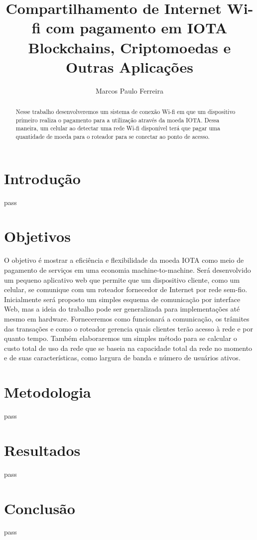 \documentclass{article}
\begin{document}
\title{%
  Compartilhamento de Internet Wi-fi com pagamento em IOTA \\
  \large Blockchains, Criptomoedas e Outras Aplicações}
    
\author{Marcos Paulo Ferreira}

\maketitle

\begin{abstract}
Nesse trabalho desenvolveremos um sistema de conexão Wi-fi em que um dispositivo primeiro realiza
o pagamento para a utilização através da moeda IOTA. Dessa maneira, um celular ao detectar uma rede
Wi-fi disponível terá que pagar uma quantidade de moeda para o roteador para se conectar ao ponto de acesso.
\end{abstract}


\section{Introdução}\label{sec:Introduction}

pass


\section{Objetivos}\label{sec:Goals}

O objetivo é mostrar a eficiência e flexibilidade da moeda IOTA como meio de pagamento de serviços em uma economia
machine-to-machine. Será desenvolvido um pequeno aplicativo web que permite que um dispositivo cliente, como um
celular, se comunique com um roteador fornecedor de Internet por rede sem-fio. Inicialmente será proposto
um simples esquema de comunicação por interface Web, mas a ideia do trabalho pode ser generalizada para implementações
até mesmo em hardware.
Forneceremos como funcionará a comunicação, os trâmites das transações e como o roteador gerencia quais clientes
terão acesso à rede e por quanto tempo. Também elaboraremos um simples método para se calcular o custo total
de uso da rede que se baseia na capacidade total da rede no momento e de suas características, como largura de banda e
número de usuários ativos.

\section{Metodologia}\label{sec:Metodology}

pass

\section{Resultados}\label{sec:Output}

pass

\section{Conclusão}
pass


%
%
\end{document}
